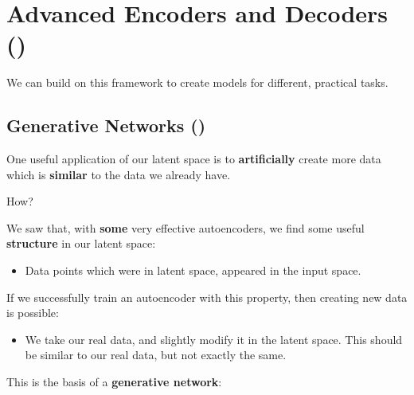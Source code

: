 \section{Advanced Encoders and Decoders ()}

    We can build on this framework to create models for different, practical tasks.

    \subsection{Generative Networks ()}

        One useful application of our latent space is to \textbf{artificially} create more data which is \textbf{similar} to the data we already have.

        How?

        We saw that, with \textbf{some} very effective autoencoders, we find some useful \textbf{structure} in our latent space:

        \begin{itemize}
            \item Data points which were  in latent space, appeared  in the input space.
        \end{itemize}
        
        If we successfully train an autoencoder with this property, then creating new data is possible:

        \begin{itemize}
            \item We take our real data, and slightly modify it in the latent space. This should be similar to our real data, but not exactly the same.
        \end{itemize}
        
        This is the basis of a \textbf{generative network}:\\


